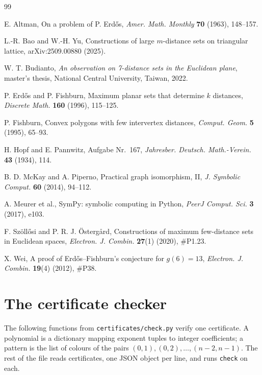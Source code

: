 \documentclass[11pt]{amsart}
\theoremstyle{definition}
\theoremstyle{remark}
\begin{document}
\begin{thebibliography}{99}

 E. Altman, On a problem of P. Erdős, \emph{Amer. Math. Monthly} \textbf{70} (1963), 148--157.

 L.-R. Bao and W.-H. Yu, Constructions of large $m$-distance sets on triangular lattice,
arXiv:2509.00880 (2025).

 W. T. Budianto, \emph{An observation on 7-distance sets in the Euclidean plane}, master's
thesis, National Central University, Taiwan, 2022.

 P. Erdős and P. Fishburn, Maximum planar sets that determine $k$ distances, \emph{Discrete
Math.} \textbf{160} (1996), 115--125.

 P. Fishburn, Convex polygons with few intervertex distances, \emph{Comput. Geom.} \textbf{5}
(1995), 65--93.

 H. Hopf and E. Pannwitz, Aufgabe Nr.~167, \emph{Jahresber. Deutsch. Math.-Verein.}
\textbf{43} (1934), 114.

 B. D. McKay and A. Piperno, Practical graph isomorphism, II, \emph{J. Symbolic Comput.}
\textbf{60} (2014), 94--112.

 A. Meurer et al., SymPy: symbolic computing in Python, \emph{PeerJ Comput. Sci.} \textbf{3}
(2017), e103.

 F. Szöllősi and P. R. J. Östergård, Constructions of maximum few-distance sets in Euclidean
spaces, \emph{Electron. J. Combin.} \textbf{27}(1) (2020), \#P1.23.

 X. Wei, A proof of Erdős--Fishburn's conjecture for $g(6)=13$, \emph{Electron. J. Combin.}
\textbf{19}(4) (2012), \#P38.

\end{thebibliography}

\appendix
\section{The certificate checker}\label{app:check}

The following functions from \texttt{certificates/check.py} verify one certificate. A polynomial is a
dictionary mapping exponent tuples to integer coefficients; a pattern is the list of colours of the pairs
$(0,1),(0,2),\dots,(n-2,n-1)$. The rest of the file reads certificates, one JSON object per line, and runs
\texttt{check} on each.


\end{document}
